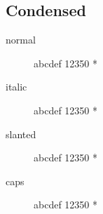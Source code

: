 \subsection{Condensed}

\begin{description}
    \item [normal]  abcdef 12350 *
    \item [italic]  abcdef 12350 *
    \item [slanted]  abcdef 12350 *
    \item [caps]  abcdef 12350 *
\end{description}